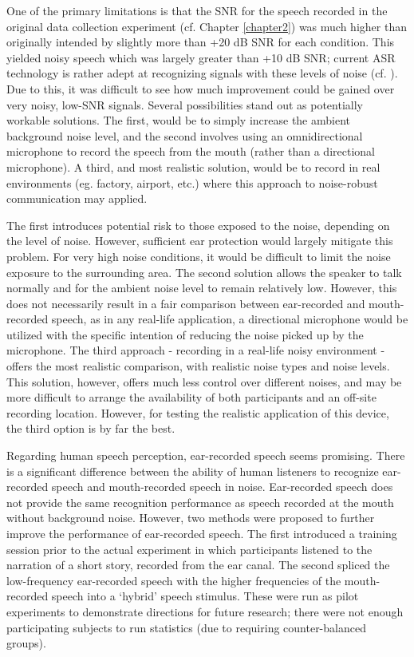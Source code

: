 One of the primary limitations is that the SNR for the speech recorded in the original data collection experiment (cf. Chapter \ref{chapter2}) was much higher than originally intended by slightly more than +20 dB SNR for each condition.  This yielded noisy speech which was largely greater than +10 dB SNR; current ASR technology is rather adept at recognizing signals with these levels of noise (cf. \cite{braun:16}).  Due to this, it was difficult to see how much improvement could be gained over very noisy, low-SNR signals.  Several possibilities stand out as potentially workable solutions.  The first, would be to simply increase the ambient background noise level, and the second involves using an omnidirectional microphone to record the speech from the mouth (rather than a directional microphone).  A third, and most realistic solution, would be to record in real environments (eg. factory, airport, etc.) where this approach to noise-robust communication may applied.

The first introduces potential risk to those exposed to the noise, depending on the level of noise.  However, sufficient ear protection would largely mitigate this problem.  For very high noise conditions, it would be difficult to limit the noise exposure to the surrounding area.  The second solution allows the speaker to talk normally and for the ambient noise level to remain relatively low.  However, this does not necessarily result in a fair comparison between ear-recorded and mouth-recorded speech, as in any real-life application, a directional microphone would be utilized with the specific intention of reducing the noise picked up by the microphone.  %
The third approach - recording in a real-life noisy environment - offers the most realistic comparison, with realistic noise types and noise levels.  This solution, however, offers much less control over different noises, and may be more difficult to arrange the availability of both participants and an off-site recording location.  However, for testing the realistic application of this device, the third option is by far the best.

Regarding human speech perception, ear-recorded speech seems promising.  There is a significant difference between the ability of human listeners to recognize ear-recorded speech and mouth-recorded speech in noise.  Ear-recorded speech does not provide the same recognition performance as speech recorded at the mouth without background noise.  However, two methods were proposed to further improve the performance of ear-recorded speech.  The first introduced a training session prior to the actual experiment in which participants listened to the narration of a short story, recorded from the ear canal.  The second spliced the low-frequency ear-recorded speech with the higher frequencies of the mouth-recorded speech into a `hybrid' speech stimulus.  These were run as pilot experiments to demonstrate directions for future research; there were not enough participating subjects to run statistics (due to requiring counter-balanced groups).  

